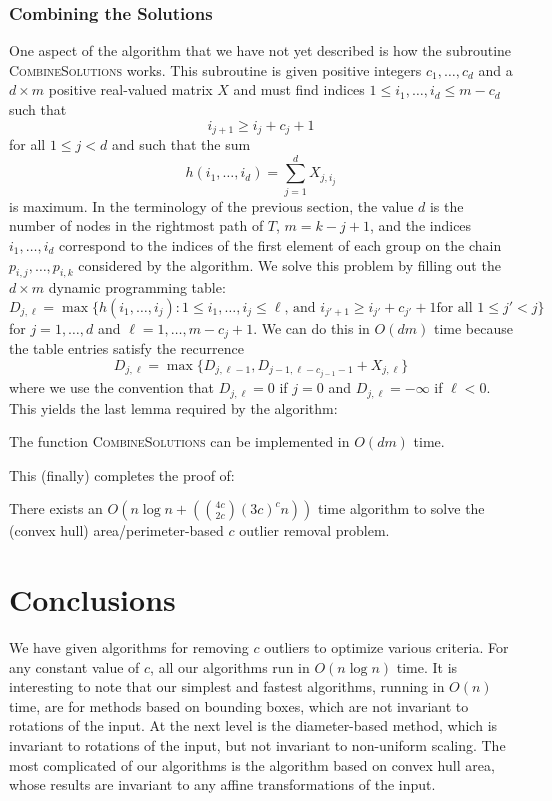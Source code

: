 \documentclass[lotsofwhite]{patmorin}
\newcommand{\runtime}{n\log n + \left({4c\choose 2c}(3c)^cn\right)}
\newcommand{\Oruntime}{O\left(\runtime\right)}
\begin{document}
\subsubsection{Combining the Solutions}

One aspect of the algorithm that we have not yet described is how the
subroutine \textsc{CombineSolutions} works.  This subroutine is given
positive integers $c_1,\ldots,c_d$ and a $d\times m$ positive
real-valued matrix $X$ and must find 
indices $1\le i_1,\ldots,i_d \le m-c_d$ such that
\[
     i_{j+1} \ge i_j + c_j + 1
\]
for all $1\le j < d$ and such that the sum
\[
      h(i_1,\ldots,i_d)=\sum_{j=1}^d X_{j,i_j}
\]
is maximum.  In the terminology of the previous section, the value $d$
is the number of nodes in the rightmost path of $T$, $m=k-j+1$, and
the indices
$i_1,\ldots,i_d$ correspond to the indices of the
first element of each group on the chain $p_{i,j},\ldots,p_{i,k}$
considered by the algorithm.
We solve this problem by filling out the $d\times m$ dynamic
programming table:
\[
     D_{j,\ell} = \max\{h(i_1,\ldots,i_j):
      \mbox{$1\le i_1,\ldots,i_j\le \ell$, and $i_{j'+1} \ge i_{j'}+c_{j'}+1$
             for all $1\le j'< j$}  \} 
\]
for $j=1,\ldots,d$ and $\ell=1,\ldots,m-c_j+1$.  We can do this in
$O(dm)$ time because the table entries satisfy the recurrence
\[
     D_{j,\ell} = \max\{D_{j,\ell-1},D_{j-1,\ell-c_{j-1}-1}+X_{j,\ell} \}
\]
where we use the convention that $D_{j,\ell} = 0$ if $j=0$ and
$D_{j,\ell}=-\infty$ if $\ell<0$.  This yields the last lemma required
by the algorithm:

\begin{lem}
The function \textsc{CombineSolutions} can be implemented in
$O(dm)$ time.
\end{lem}

This (finally) completes the proof of:
\begin{thm}
There exists an 
$\Oruntime$ time
algorithm to solve
the (convex hull) area/perimeter-based $c$ outlier removal problem.
\end{thm}

\section{Conclusions}

We have given algorithms for removing $c$ outliers to optimize various
criteria. For any constant value of $c$, all our algorithms run in
$O(n\log n)$ time.  It is interesting to note that our simplest and
fastest algorithms, running in $O(n)$ time, are for methods based on
bounding boxes, which are not invariant to rotations of the input.  At
the next level is the diameter-based method, which is invariant to
rotations of the input, but not invariant to non-uniform scaling.  The
most complicated of our algorithms is the algorithm based on convex
hull area, whose results are invariant to any affine transformations
of the input.
\end{document}
